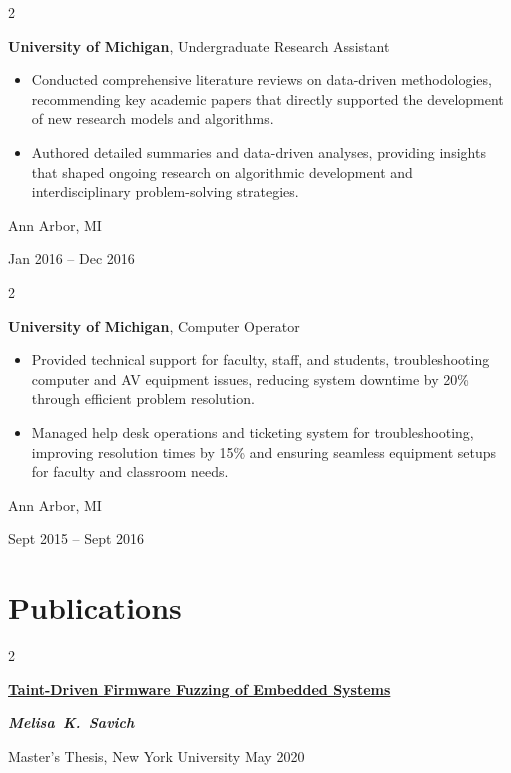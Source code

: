\documentclass[10pt, a4paper]{article}
\newenvironment{highlights}{
    \begin{itemize}[
        topsep=0.1 cm,
        parsep=0.1 cm,
        partopsep=0pt,
        itemsep=0pt,
        leftmargin=0.2 cm + 10pt
    ]
}{
    \end{itemize}
} %
\newenvironment{twocolentry}[2][]{
    \onecolentry
    \def\secondColumn{#2}
    \setcolumnwidth{\fill, 4 cm}
    \begin{paracol}{2}
}{
    \switchcolumn \raggedleft \secondColumn
    \end{paracol}
    \endonecolentry
} %
\begin{document}
        \vspace{0.5 cm}

        \begin{twocolentry}{
            Ann Arbor, MI

        Jan 2016 – Dec 2016
        }
            \textbf{University of Michigan}, Undergraduate Research Assistant
            \begin{highlights}
                \item Conducted comprehensive literature reviews on data-driven methodologies, recommending key academic papers that directly supported the development of new research models and algorithms.
                \item Authored detailed summaries and data-driven analyses, providing insights that shaped ongoing research on algorithmic development and interdisciplinary problem-solving strategies.
            \end{highlights}
        \end{twocolentry}


        \vspace{0.5 cm}

        \begin{twocolentry}{
            Ann Arbor, MI

        Sept 2015 – Sept 2016
        }
            \textbf{University of Michigan}, Computer Operator
            \begin{highlights}
                \item Provided technical support for faculty, staff, and students, troubleshooting computer and AV equipment issues, reducing system downtime by 20\% through efficient problem resolution.
                \item Managed help desk operations and ticketing system for troubleshooting, improving resolution times by 15\% and ensuring seamless equipment setups for faculty and classroom needs.
            \end{highlights}
        \end{twocolentry}



    
    \section{Publications}



        
        \begin{samepage}
            \begin{twocolentry}{
                May 2020
            }
                \textbf{\href{https://melisasavich.com/pubs/taint-driven-firmware-fuzzing-embedded-systems-thesis.pdf}{Taint-Driven Firmware Fuzzing of Embedded Systems}}

                \vspace{0.1 cm}

                \mbox{\textbf{\textit{Melisa K. Savich}}}
                \vspace{0.1 cm}

        Master's Thesis, New York University    \end{twocolentry}
        \end{samepage}
\end{document}
